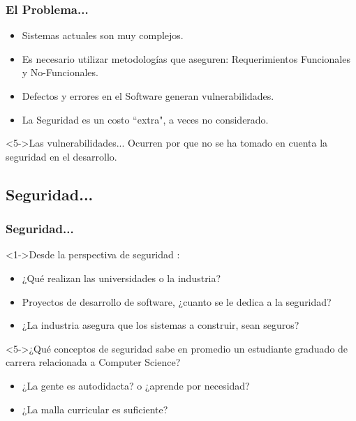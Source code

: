 \documentclass[serif,9pt]{beamer}
\begin{document}
\begin{frame}
	\frametitle{El Problema...}
	\begin{itemize}
		\item<1-> Sistemas actuales son muy complejos.
		\item<2-> Es necesario utilizar metodologías que aseguren: Requerimientos Funcionales y No-Funcionales.
		\item<3-> Defectos y errores en el Software generan vulnerabilidades.
		\item<4-> La Seguridad es un costo ``extra", a veces no considerado.
	\end{itemize}
	\begin{block}<5->{Las vulnerabilidades...}
		Ocurren por que no se ha tomado en cuenta la seguridad en el desarrollo.
	\end{block}
\end{frame}


\subsection{Seguridad...}
\begin{frame}
\frametitle{Seguridad...}
	\begin{block}<1->{Desde la perspectiva de seguridad \cite{WhyteHarrison}:}
		\begin{itemize}		
			\item<2-> ¿Qu\'e realizan las universidades o la industria?
			\item<3-> Proyectos de desarrollo de software, ¿cuanto se le dedica a la seguridad?
			\item<4-> ¿La industria asegura que los sistemas a construir, sean seguros?
		\end{itemize}
	\end{block}
	\begin{block}<5->{¿Qu\'e conceptos de seguridad sabe en promedio un estudiante graduado de carrera relacionada a Computer Science?}
		\begin{itemize}
			\item<6-> ¿La gente es autodidacta? o ¿aprende por necesidad?
			\item<7-> ¿La malla curricular es suficiente?
		\end{itemize}
	\end{block}
\end{frame}
\end{document}
